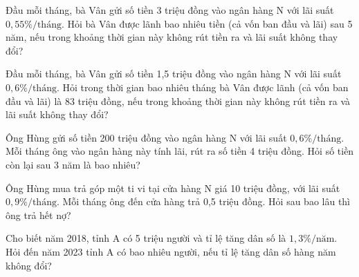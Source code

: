 %
\begin{bt}%
	Đầu mỗi tháng, bà Vân gửi số tiền 3 triệu đồng vào ngân hàng N với lãi suất $0,55\% / \mbox{tháng}$. Hỏi bà Vân được lãnh bao nhiêu tiền (cả vốn ban đầu và lãi) sau 5 năm, nếu trong khoảng thời gian này không rút tiền ra và lãi suất không thay đổi?
\end{bt}
%
%
\begin{bt}%
	Đầu mỗi tháng, bà Vân gửi số tiền 1,5 triệu đồng vào ngân hàng N với lãi suất $0,6\% / \mbox{tháng}$. Hỏi trong thời gian bao nhiêu tháng bà Vân được lãnh (cả vốn ban đầu và lãi) là 83 triệu đồng, nếu trong khoảng thời gian này không rút tiền ra và lãi suất không thay đổi?
\end{bt}
%
%
\begin{bt}%
	Ông Hùng gửi số tiền 200 triệu đồng vào ngân hàng N với lãi suất $0,6\% / \mbox{tháng}$. Mỗi tháng ông vào ngân hàng này tính lãi, rút ra số tiền 4 triệu đồng. Hỏi số tiền còn lại sau 3 năm là bao nhiêu?
\end{bt}
%
\begin{bt}%
Ông Hùng mua trả góp một ti vi tại cửa hàng N giá 10 triệu đồng, với lãi suất $0,9\% / \mbox{tháng}$. Mỗi tháng ông đến cửa hàng trả 0,5 triệu đồng. Hỏi sau bao lâu thì ông trả hết nợ?
\end{bt}
%
\begin{bt}%
Cho biết năm 2018, tỉnh A có 5 triệu người và tỉ lệ tăng dân số là $1,3\% / \mbox{năm}$. Hỏi đến năm 2023 tỉnh A có bao nhiêu người, nếu tỉ lệ tăng dân số hàng năm không đổi?
\end{bt}
